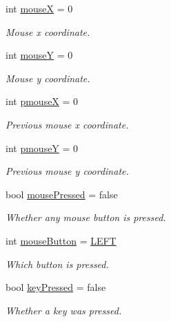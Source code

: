 \begin{DoxyCompactItemize}
\item 
int \hyperlink{namespacecprocessing_aca55645dc8d20d72de21bc8cf2c5bcd0}{mouse\-X} = 0
\begin{DoxyCompactList}\small\item\em \-Mouse x coordinate. \end{DoxyCompactList}\item 
int \hyperlink{namespacecprocessing_ac81e2d0a39a3d606e9e6d870e31534ee}{mouse\-Y} = 0
\begin{DoxyCompactList}\small\item\em \-Mouse y coordinate. \end{DoxyCompactList}\item 
int \hyperlink{namespacecprocessing_afa6d39daa03165222e3c969b1ce26571}{pmouse\-X} = 0
\begin{DoxyCompactList}\small\item\em \-Previous mouse x coordinate. \end{DoxyCompactList}\item 
int \hyperlink{namespacecprocessing_a51d209877748101ea857d64bc9b6ff2d}{pmouse\-Y} = 0
\begin{DoxyCompactList}\small\item\em \-Previous mouse y coordinate. \end{DoxyCompactList}\item 
bool \hyperlink{namespacecprocessing_a02981e7550d1c27e3ae792450172f4b7}{mouse\-Pressed} = false
\begin{DoxyCompactList}\small\item\em \-Whether any mouse button is pressed. \end{DoxyCompactList}\item 
int \hyperlink{namespacecprocessing_ac291906023e7749b6351265a5a5f589e}{mouse\-Button} = \hyperlink{namespacecprocessing_a39d84f96f7411fee29eda510a17b1089ac8df9c95ae0f6e4eafb5e419637d7603}{\-L\-E\-F\-T}
\begin{DoxyCompactList}\small\item\em \-Which button is pressed. \end{DoxyCompactList}\item 
bool \hyperlink{namespacecprocessing_afc97118ddb342c47a4b70c6965dfee09}{key\-Pressed} = false
\begin{DoxyCompactList}\small\item\em \-Whether a key was pressed. \end{DoxyCompactList}\item 

\end{DoxyCompactItemize}
